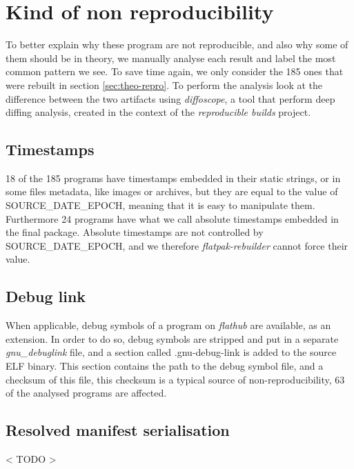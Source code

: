 \documentclass[a4paper,11pt,oneside]{report}
\theoremstyle{definition}
\newcommand{\sysname}{\emph{flatpak-rebuilder}\xspace}
\newcommand{\rb}{\emph{reproducible builds}\xspace}
\newcommand{\fh}{\emph{flathub}\xspace}
\newcommand{\sde}{SOURCE\_DATE\_EPOCH\xspace}
\newcommand{\dfc}{\emph{diffoscope}\xspace}
\begin{document}
\section{Kind of non reproducibility}
To better explain why these program are not reproducible, and also why some of
them should be in theory, we manually analyse each result and label the most
common pattern we see. To save time again, we only consider the 185 ones that
were rebuilt in section \autoref{sec:theo-repro}. To perform the analysis look
at the difference between the two artifacts using \dfc, a tool that perform
deep diffing analysis, created in the context of the \rb project.

\subsection{Timestamps}
18 of the 185 programs have timestamps embedded in their static strings, or in
some files metadata, like images or archives, but they are equal to the value
of \sde, meaning that it is easy to manipulate them. Furthermore 24 programs
have what we call absolute timestamps embedded in the final package. Absolute
timestamps are not controlled by \sde, and we therefore \sysname cannot force
their value.

\subsection{Debug link}
When applicable, debug symbols of a program on \fh are available, as an
extension. In order to do so, debug symbols are stripped and put in a separate
\emph{gnu\_debuglink} file, and a section called .gnu-debug-link is added to the
source ELF binary. This section contains the path to the debug symbol file, and
a checksum of this file, this checksum is a typical source of
non-reproducibility, 63 of the analysed programs are affected.


\subsection{Resolved manifest serialisation}
< TODO >
\end{document}
